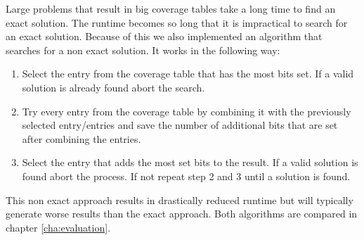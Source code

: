 Large problems that result in big coverage tables take a long time to find an exact solution. The runtime becomes so long that it is impractical to search for an exact solution. Because of this we also implemented an algorithm that searches for a non exact solution. It works in the following way:
\begin{enumerate}
\item Select the entry from the coverage table that has the most bits set. If a valid solution is already found abort the search.
\item Try every entry from the coverage table by combining it with the previously selected entry/entries and save the number of additional bits that are set after combining the entries.
\item Select the entry that adds the most set bits to the result. If a valid solution is found abort the process. If not repeat step 2 and 3 until a solution is found.
\end{enumerate}

This non exact approach results in drastically reduced runtime but will typically generate worse results than the exact approach. Both algorithms are compared in chapter \ref{cha:evaluation}.